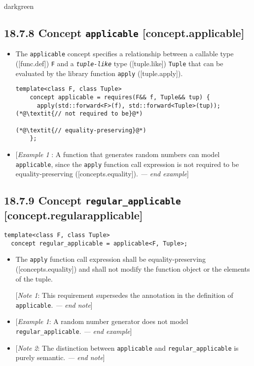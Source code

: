 \documentclass{article}
\begin{document}
\begin{color}{darkgreen}
\subsection*{18.7.8 Concept \texttt{applicable} [concept.applicable]}
\begin{itemize}
\item The \texttt{applicable} concept specifies a relationship between a
callable type ([func.def]) \texttt{F} and a \texttt{\textit{tuple-like}} type ([tuple.like])
\texttt{Tuple} that can be evaluated by the library function \texttt{apply} ([tuple.apply]).

\begin{lstlisting}[style=base]
  template<class F, class Tuple>
    concept applicable = requires(F&& f, Tuple&& tup) {
      apply(std::forward<F>(f), std::forward<Tuple>(tup)); (*@\textit{// not required to be}@*)
                                                           (*@\textit{// equality-preserving}@*)
    };
\end{lstlisting}

\item {[}\textit{Example 1 }: A function that generates random numbers can model
\texttt{applicable}, since the \texttt{apply} function call expression is not required to be
equality-preserving ([concepts.equality]). \textit{--- end example}{]}
\end{itemize}


\subsection*{18.7.9 Concept \texttt{regular\_applicable} [concept.regularapplicable]}

\begin{lstlisting}[style=base]
template<class F, class Tuple>
  concept regular_applicable = applicable<F, Tuple>;
\end{lstlisting}

\begin{itemize}
\item The \texttt{apply} function call expression shall be equality-preserving
  ([concepts.equality]) and shall not modify the function object or the elements
  of the tuple.

  {[}\textit{Note 1}: This requirement supersedes the annotation in the definition
  of \texttt{applicable}. \textit{--- end note}{]}

\item {[}\textit{Example 1}: A random number generator does not model
  \texttt{regular\_applicable}. \textit{--- end example}{]}

\item {[}\textit{Note 2}: The distinction between \texttt{applicable} and
  \texttt{regular\_applicable} is purely semantic. \textit{--- end note}{]}
\end{itemize}
\end{color}
\end{document}
